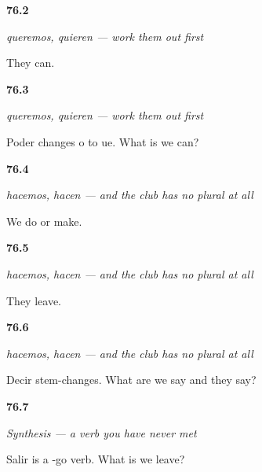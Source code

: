 \noindent\begin{minipage}[t]{\linewidth}
\raggedright
\hypertarget{review-ES-C13-plurales-cambio-can}{\textbf{76.2}} \emph{queremos, quieren — work them out first}\par
\small They can.
\end{minipage}\par\medskip

\noindent\begin{minipage}[t]{\linewidth}
\raggedright
\hypertarget{review-ES-C13-plurales-cambio-derive}{\textbf{76.3}} \emph{queremos, quieren — work them out first}\par
\small Poder changes o to ue. What is we can?
\end{minipage}\par\medskip

\noindent\begin{minipage}[t]{\linewidth}
\raggedright
\hypertarget{review-ES-C13-plurales-yo-go-we}{\textbf{76.4}} \emph{hacemos, hacen — and the club has no plural at all}\par
\small We do or make.
\end{minipage}\par\medskip

\noindent\begin{minipage}[t]{\linewidth}
\raggedright
\hypertarget{review-ES-C13-plurales-yo-go-out}{\textbf{76.5}} \emph{hacemos, hacen — and the club has no plural at all}\par
\small They leave.
\end{minipage}\par\medskip

\noindent\begin{minipage}[t]{\linewidth}
\raggedright
\hypertarget{review-ES-C13-plurales-yo-go-say}{\textbf{76.6}} \emph{hacemos, hacen — and the club has no plural at all}\par
\small Decir stem-changes. What are we say and they say?
\end{minipage}\par\medskip

\noindent\begin{minipage}[t]{\linewidth}
\raggedright
\hypertarget{review-ES-C13-sintesis-derivar-count}{\textbf{76.7}} \emph{Synthesis — a verb you have never met}\par
\small Salir is a -go verb. What is we leave?
\end{minipage}\par\medskip

